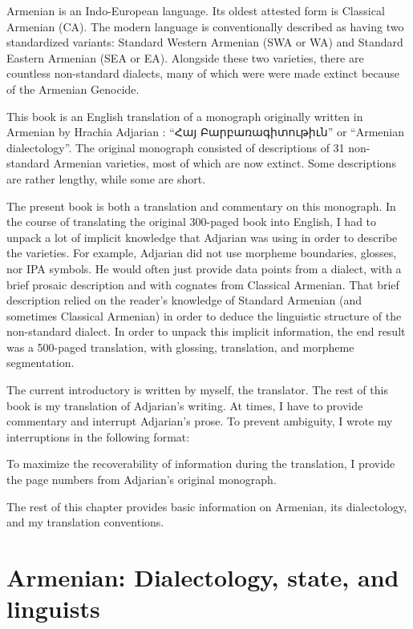 Armenian is an Indo-European language. Its oldest attested form is Classical Armenian (CA). The modern language    is conventionally described as having two standardized variants: Standard Western Armenian (SWA or WA) and Standard Eastern Armenian (SEA or EA).  Alongside these two varieties, there are countless non-standard dialects, many of which were were made extinct because of the Armenian Genocide. 

This book is an English translation of a monograph originally written in Armenian by Hrachia Adjarian \citep{Adjarian-1911-DialectologyBook}: ``Հայ Բարբառագիտութիւն'' or ``Armenian dialectology''. The original monograph consisted of descriptions of 31 non-standard Armenian varieties, most of which are now extinct. Some descriptions are rather lengthy, while some are short. 

The present book is both a translation and commentary on this monograph. In the course of translating the original 300-paged book into English, I had to unpack a lot of implicit knowledge that Adjarian was using in order to describe the varieties. For example, Adjarian did not use morpheme boundaries, glosses, nor IPA symbols.  He would often just provide data points from a dialect, with a brief prosaic description and with cognates from Classical Armenian. That brief description relied on the reader's knowledge of Standard Armenian (and sometimes Classical Armenian) in order to deduce the linguistic structure of the non-standard dialect. In order to unpack this implicit information, the end result was a 500-paged translation, with glossing, translation, and morpheme segmentation.


The current introductory is written by myself, the translator. The rest of this book is my translation of Adjarian's writing. At times, I have to provide commentary and interrupt Adjarian's prose. To prevent ambiguity, I wrote my interruptions in the following format:

\begin{center}
\end{center}

To maximize the recoverability of information during the translation, I provide the page numbers from Adjarian's original monograph. 

The rest of this chapter provides basic information on Armenian, its dialectology, and my translation conventions.

\section{Armenian: Dialectology, state, and linguists}

